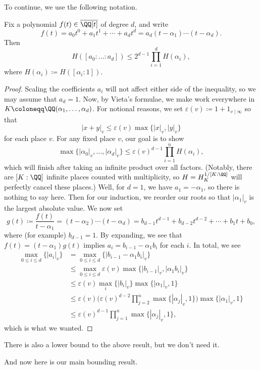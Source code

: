 \documentclass[../notes.tex]{subfiles}
\begin{document}
To continue, we use the following notation.
\begin{lemma} \label{lem:roots-to-poly-height}
	Fix a polynomial $f(t)\in\overline\QQ[t]$ of degree $d$, and write
	\[f(t)=a_0t^0+a_1t^1+\cdots+a_dt^d=a_d(t-\alpha_1)\cdots(t-\alpha_d).\]
	Then
	\[H([a_0:\ldots:a_d])\le 2^{d-1}\prod_{i=1}^dH(\alpha_i),\]
	where $H(\alpha_i)\coloneqq H([\alpha_i:1])$.
\end{lemma}
\begin{proof}
	Scaling the coefficients $a_i$ will not affect either side of the inequality, so we may assume that $a_d=1$. Now, by Vieta's formulae, we make work everywhere in $K\coloneqq\QQ(\alpha_1,\ldots,\alpha_d)$. For notional reasons, we set $\varepsilon(v)\coloneqq1+1_{v\mid\infty}$ so that
	\[|x+y|_v\le\varepsilon(v)\max\{|x|_v,|y|_v\}\]
	for each place $v$. For any fixed place $v$, our goal is to show
	\[\max\{|\alpha_0|_v,\ldots,|\alpha_d|_v\}\le\varepsilon(v)^{d-1}\prod_{i=1}^nH(\alpha_i),\]
	which will finish after taking an infinite product over all factors. (Notably, there are $[K:\QQ]$ infinite places counted with multiplicity, so $H=H_K^{1/[K:\QQ]}$ will perfectly cancel these places.) Well, for $d=1$, we have $a_1=-\alpha_1$, so there is nothing to say here. Then for our induction, we reorder our roots so that $|\alpha_1|_v$ is the largest absolute value. We now set
	\[g(t)\coloneqq\frac{f(t)}{t-\alpha_1}=(t-\alpha_2)\cdots(t-\alpha_d)=b_{d-1}t^{d-1}+b_{d-2}t^{d-2}+\cdots+b_1t+b_0,\]
	where (for example) $b_{d-1}=1$. By expanding, we see that $f(t)=(t-\alpha_1)g(t)$ implies $a_i=b_{i-1}-\alpha_1b_i$ for each $i$. In total, we see
	\begin{align*}
		\max_{0\le i\le d}\{|a_i|_v\} &= \max_{0\le i\le d}\{|b_{i-1}-\alpha_1b_i|_v\} \\
		&\le \max_{0\le i\le d}\varepsilon(v)\max\{|b_{i-1}|_v,|\alpha_1b_{i}|_v\} \\
		&\le\varepsilon(v)\max_{i}\{|b_i|_v\}\max\{|\alpha_1|_v,1\} \\
		&\le\varepsilon(v)\Bigg(\varepsilon(v)^{d-2}\prod_{j=2}^n\max\{|\alpha_j|_v,1\}\Bigg)\max\{|\alpha_1|_v,1\} \\
		&\le\varepsilon(v)^{d-1}\prod_{j=1}^n\max\{|\alpha_j|_v,1\},
	\end{align*}
	which is what we wanted.
\end{proof}
\begin{remark}
	There is also a lower bound to the above result, but we don't need it.
\end{remark}
And now here is our main bounding result.
\end{document}
